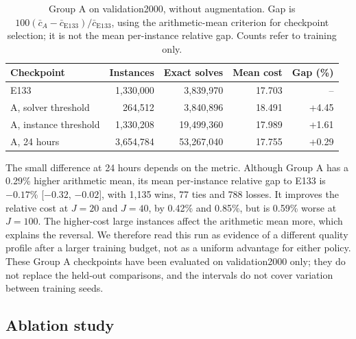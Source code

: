 \documentclass[preprint,12pt,authoryear]{elsarticle}
\begin{document}
\begin{table}[t]
\centering
\caption{Group A on validation2000, without augmentation. Gap is $100(\bar{c}_{A}-\bar{c}_{\mathrm{E133}})/\bar{c}_{\mathrm{E133}}$, using the arithmetic-mean criterion for checkpoint selection; it is not the mean per-instance relative gap. Counts refer to training only.}
\label{tab:ablationA}
\small
\begin{tabular}{lrrrr}
\toprule
Checkpoint & Instances & Exact solves & Mean cost & Gap (\%) \\
\midrule
E133 & 1,330,000 & 3,839,970 & 17.703 & -- \\
A, solver threshold & 264,512 & 3,840,896 & 18.491 & +4.45 \\
A, instance threshold & 1,330,208 & 19,499,360 & 17.989 & +1.61 \\
A, 24 hours & 3,654,784 & 53,267,040 & 17.755 & +0.29 \\
\bottomrule
\end{tabular}
\end{table}

The small difference at 24 hours depends on the metric. Although Group A has a 0.29\% higher arithmetic mean, its mean per-instance relative gap to E133 is $-0.17$\% [$-0.32$, $-0.02$], with 1,135 wins, 77 ties and 788 losses. It improves the relative cost at $J = 20$ and $J = 40$, by 0.42\% and 0.85\%, but is 0.59\% worse at $J = 100$. The higher-cost large instances affect the arithmetic mean more, which explains the reversal. We therefore read this run as evidence of a different quality profile after a larger training budget, not as a uniform advantage for either policy. These Group A checkpoints have been evaluated on validation2000 only; they do not replace the held-out comparisons, and the intervals do not cover variation between training seeds.

\subsection{Ablation study}
\label{sec:ablation}
\end{document}
